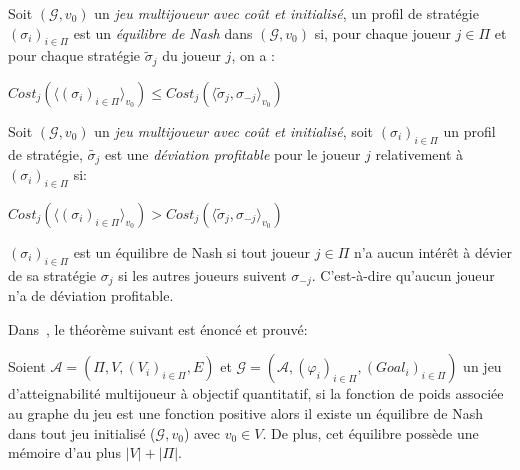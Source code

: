 






\begin{defi}
	
	Soit $(\mathcal{G}, v_{0})$ un \textit{jeu multijoueur avec coût et initialisé}, un profil de stratégie $(\sigma _{i})_{i \in \Pi}$ est un \textit{équilibre de Nash} dans $(\mathcal{G}, v_{0})$ si, pour chaque joueur $j \in \Pi$ et pour chaque stratégie $\tilde{\sigma}_{j}$ du joueur $j$, on a :
	\begin{center}$ Cost_{j}(\langle (\sigma _{i})_{i \in \Pi}\rangle_{v_0}) \leq Cost_{j}(\langle \tilde{\sigma} _{j} ,\sigma _{-j}\rangle_{v_0})$ \end{center}
\end{defi}	



\begin{defi}
	
	Soit $(\mathcal{G}, v_{0})$ un \textit{jeu multijoueur avec coût et initialisé}, soit $(\sigma _{i})_{i \in \Pi}$ un profil de stratégie, $\tilde{\sigma _{j}}$ est une \textit{déviation profitable} pour le joueur $j$ relativement à $(\sigma _{i})_{i \in \Pi}$ si:
	\begin{center} $ Cost_{j}(\langle (\sigma _{i})_{i \in \Pi} \rangle_{v_0}) > Cost_{j}(\langle \tilde{\sigma} _{j} ,\sigma _{-j} \rangle_{v_0})$ \end{center}
\end{defi}

\begin{rem}
	$(\sigma _{i})_{i\in \Pi}$ est un équilibre de Nash si tout joueur $j \in \Pi$ n'a aucun intérêt à dévier de sa stratégie $\sigma _{j}$ si les autres joueurs suivent $\sigma _{-j}$. C'est-à-dire qu'aucun joueur n'a de déviation profitable. 
\end{rem}





 Dans~\cite{DBLP:conf/lfcs/BrihayePS13}, le théorème suivant est énoncé et prouvé:

\begin{thm}
	Soient $\mathcal{A} = (\Pi, V, (V_{i})_{i \in \Pi}, E)$ et $\mathcal{G} = (\mathcal{A},(\varphi _{i})_{i \in \Pi}, (Goal_{i})_{i \in \Pi})$ un jeu d'atteignabilité multijoueur à objectif quantitatif, si la fonction de poids associée au graphe du jeu est une fonction positive alors il existe un équilibre de Nash dans tout jeu initialisé ($\mathcal{G},v_{0}$) avec $v_{0}\in V$. De plus, cet équilibre possède une mémoire d'au plus $|V| + |\Pi|$.
\end{thm}

